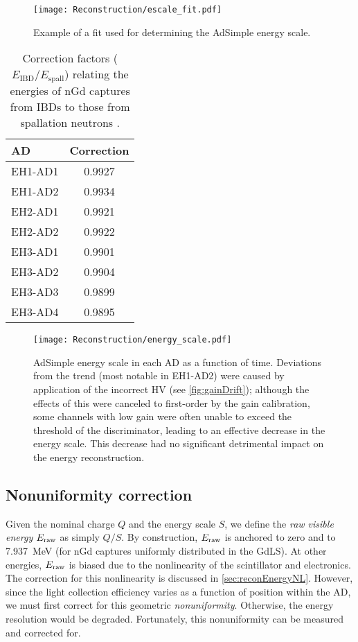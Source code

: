 \documentclass[../thesis.tex]{subfiles}
\begin{document}
\begin{figure}[ht]
  \texttt{[image: Reconstruction/escale\_fit.pdf]}
  \caption{Example of a fit used for determining the AdSimple energy scale.}
  \label{fig:escale_fit}
\end{figure}

\begin{table}[ht]
  \begin{tabular}{lc}
    \toprule
    AD & Correction \\
    \midrule
    EH1-AD1 & 0.9927 \\
    EH1-AD2 & 0.9934 \\
    EH2-AD1 & 0.9921 \\
    EH2-AD2 & 0.9922 \\
    EH3-AD1 & 0.9901 \\
    EH3-AD2 & 0.9904 \\
    EH3-AD3 & 0.9899 \\
    EH3-AD4 & 0.9895 \\
    \bottomrule
  \end{tabular}
  \caption{Correction factors ($E_{\mathrm{IBD}}/E_{\mathrm{spall}}$) relating the energies of nGd captures from IBDs to those from spallation neutrons \cite{spallScaleCorr}.}
  \label{tab:ibdSpallCorrs}
\end{table}

\begin{figure}[ht]
  \texttt{[image: Reconstruction/energy\_scale.pdf]}
  \caption{AdSimple energy scale in each AD as a function of time. Deviations from the trend (most notable in EH1-AD2) were caused by application of the incorrect HV (see \autoref{fig:gainDrift}); although the effects of this were canceled to first-order by the gain calibration, some channels with low gain were often unable to exceed the threshold of the discriminator, leading to an effective decrease in the energy scale. This decrease had no significant detrimental impact on the energy reconstruction.}
  \label{fig:energy_scales}
\end{figure}

\subsection{Nonuniformity correction}
\label{sec:reconEnergyNU}

Given the nominal charge $Q$ and the energy scale $S$, we define the \emph{raw visible energy} $E_\mathrm{raw}$ as simply $Q/S$. By construction, $E_\mathrm{raw}$ is anchored to zero and to 7.937~MeV (for nGd captures uniformly distributed in the GdLS). At other energies, $E_\mathrm{raw}$ is biased due to the nonlinearity of the scintillator and electronics. The correction for this nonlinearity is discussed in \autoref{sec:reconEnergyNL}. However, since the light collection efficiency varies as a function of position within the AD, we must first correct for this geometric \emph{nonuniformity}. Otherwise, the energy resolution would be degraded. Fortunately, this nonuniformity can be measured and corrected for.
\end{document}
